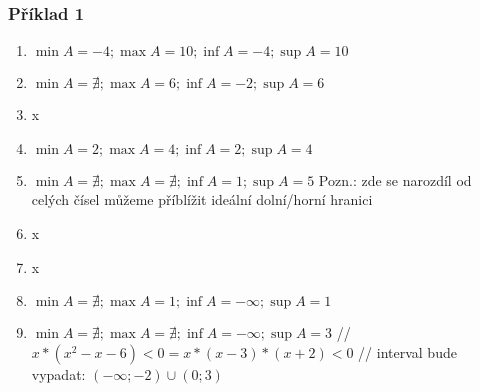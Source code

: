\documentclass[12pt, a4paper]{scrartcl}
\begin{document}
    \subsubsection{Příklad 1}
    \begin{enumerate}
        \item $\min A = -4 ;\max A = 10 ;\inf A = -4 ;\sup A = 10$
        \item $\min A = \nexists ;\max A = 6 ;\inf A = -2 ;\sup A = 6$
        \item x
        \item $\min A = 2 ;\max A = 4 ;\inf A = 2 ;\sup A = 4$
        \item $\min A = \nexists ;\max A = \nexists ;\inf A = 1 ;\sup A = 5$ Pozn.: zde se narozdíl od celých čísel můžeme příblížit ideální dolní/horní hranici
        \item x 
        \item x 
        \item $\min A = \nexists ;\max A = 1 ;\inf A = -\infty ;\sup A = 1$
        \item $\min A = \nexists ;\max A = \nexists ;\inf A = -\infty ;\sup A = 3$ // $x * (x^2 - x - 6) < 0 = x * (x-3)*(x+2) < 0$ // interval bude vypadat: $(-\infty ; -2) \cup (0; 3)$
    \end{enumerate}
\end{document}

